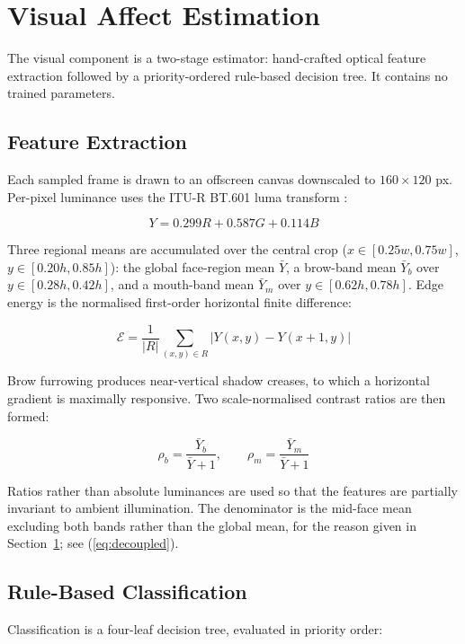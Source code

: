 \documentclass[runningheads]{llncs}
\begin{document}
\section{Visual Affect Estimation}
\label{sec:vision}

The visual component is a two-stage estimator: hand-crafted optical feature
extraction followed by a priority-ordered rule-based decision tree. It contains
no trained parameters.

\subsection{Feature Extraction}
Each sampled frame is drawn to an offscreen canvas downscaled to
$160 \times 120$ px. Per-pixel luminance uses the ITU-R BT.601 luma transform
\cite{bt601}:

\begin{equation}
Y = 0.299R + 0.587G + 0.114B
\end{equation}

Three regional means are accumulated over the central crop
($x \in [0.25w, 0.75w]$, $y \in [0.20h, 0.85h]$): the global face-region mean
$\bar{Y}$, a brow-band mean $\bar{Y}_b$ over $y \in [0.28h, 0.42h]$, and a
mouth-band mean $\bar{Y}_m$ over $y \in [0.62h, 0.78h]$. Edge energy is the
normalised first-order horizontal finite difference:

\begin{equation}
\mathcal{E} = \frac{1}{|R|}\sum_{(x,y) \in R} \bigl| Y(x,y) - Y(x{+}1,y) \bigr|
\end{equation}

Brow furrowing produces near-vertical shadow creases, to which a horizontal
gradient is maximally responsive. Two scale-normalised contrast ratios are
then formed:

\begin{equation}
\rho_b = \frac{\bar{Y}_b}{\bar{Y} + 1}, \qquad
\rho_m = \frac{\bar{Y}_m}{\bar{Y} + 1}
\end{equation}

Ratios rather than absolute luminances are used so that the features are
partially invariant to ambient illumination. The denominator is the mid-face
mean excluding both bands rather than the global mean, for the reason given in
Section~\ref{sec:vision}; see (\ref{eq:decoupled}).

\subsection{Rule-Based Classification}
Classification is a four-leaf decision tree, evaluated in priority order:
\end{document}

